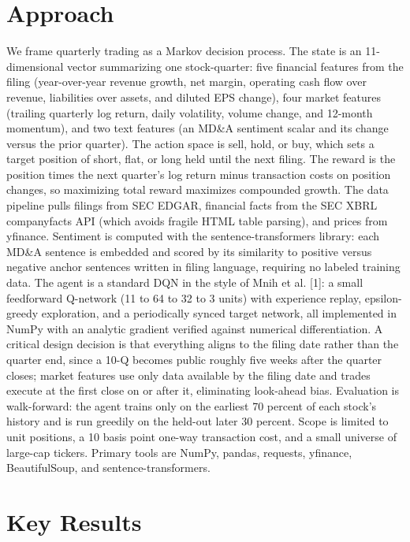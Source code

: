 \documentclass[11pt, letterpaper]{article}
\begin{document}
\section{Approach}

We frame quarterly trading as a Markov decision process. The state is an 11-dimensional vector summarizing one stock-quarter: five financial features from the filing (year-over-year revenue growth, net margin, operating cash flow over revenue, liabilities over assets, and diluted EPS change), four market features (trailing quarterly log return, daily volatility, volume change, and 12-month momentum), and two text features (an MD\&A sentiment scalar and its change versus the prior quarter). The action space is sell, hold, or buy, which sets a target position of short, flat, or long held until the next filing. The reward is the position times the next quarter's log return minus transaction costs on position changes, so maximizing total reward maximizes compounded growth. The data pipeline pulls filings from SEC EDGAR, financial facts from the SEC XBRL companyfacts API (which avoids fragile HTML table parsing), and prices from yfinance. Sentiment is computed with the sentence-transformers library: each MD\&A sentence is embedded and scored by its similarity to positive versus negative anchor sentences written in filing language, requiring no labeled training data. The agent is a standard DQN in the style of Mnih et al. [1]: a small feedforward Q-network (11 to 64 to 32 to 3 units) with experience replay, epsilon-greedy exploration, and a periodically synced target network, all implemented in NumPy with an analytic gradient verified against numerical differentiation. A critical design decision is that everything aligns to the filing date rather than the quarter end, since a 10-Q becomes public roughly five weeks after the quarter closes; market features use only data available by the filing date and trades execute at the first close on or after it, eliminating look-ahead bias. Evaluation is walk-forward: the agent trains only on the earliest 70 percent of each stock's history and is run greedily on the held-out later 30 percent. Scope is limited to unit positions, a 10 basis point one-way transaction cost, and a small universe of large-cap tickers. Primary tools are NumPy, pandas, requests, yfinance, BeautifulSoup, and sentence-transformers.

\section{Key Results}
\end{document}

